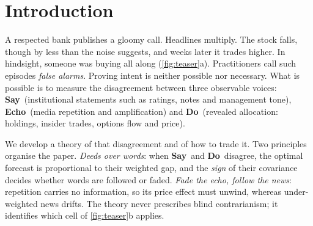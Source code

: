 \documentclass[10pt,twocolumn,letterpaper]{article}
\theoremstyle{plain}
\theoremstyle{definition}
\theoremstyle{remark}
\newcommand{\SAY}{\textcolor{say}{\textsf{\textbf{Say}}}}
\newcommand{\ECHO}{\textcolor{echo}{\textsf{\textbf{Echo}}}}
\newcommand{\DO}{\textcolor{do}{\textsf{\textbf{Do}}}}
\begin{document}
\section{Introduction}\label{sec:intro}

A respected bank publishes a gloomy call. Headlines multiply. The stock falls, though by less than the noise suggests, and weeks later it trades higher. In hindsight, someone was buying all along (\cref{fig:teaser}a). Practitioners call such episodes \emph{false alarms}. Proving intent is neither possible nor necessary. What is possible is to measure the disagreement between three observable voices: \SAY\ (institutional statements such as ratings, notes and management tone), \ECHO\ (media repetition and amplification) and \DO\ (revealed allocation: holdings, insider trades, options flow and price).

We develop a theory of that disagreement and of how to trade it. Two principles organise the paper. \emph{Deeds over words}: when \SAY\ and \DO\ disagree, the optimal forecast is proportional to their weighted gap, and the \emph{sign} of their covariance decides whether words are followed or faded. \emph{Fade the echo, follow the news}: repetition carries no information, so its price effect must unwind, whereas under-weighted news drifts. The theory never prescribes blind contrarianism; it identifies which cell of \cref{fig:teaser}b applies.
\end{document}
